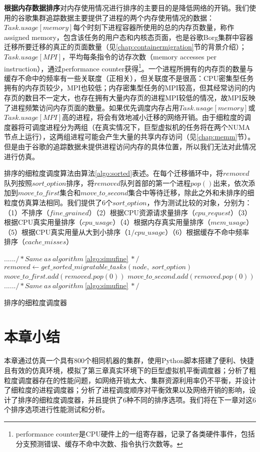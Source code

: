 \noindent\textbf{根据内存数据排序}\quad 对内存使用情况进行排序的主要目的是降低网络的开销。我们使用的谷歌集群追踪数据主要提供了进程的两个内存使用情况的数据：$Task.usage[memory]$每个时刻下进程容器所使用的总的内存页数量，称作assigned memory，包含该任务的用户态和内核态页面，也是谷歌Borg集群中容器迁移所要迁移的真正的页面数量（见\ref{chap:containermigration}节的背景介绍）；$Task.usage[MPI]$，平均每条指令的访存次数（memory accesses per instruction），通过performance counter获得\footnote{performance counter\cite{perf}是CPU硬件上的一组寄存器，记录了各类硬件事件，包括分支预测错误、缓存不命中次数、指令执行次数等。}。一个进程所拥有的内存页的数量与缓存不命中的频率有一些关联度（正相关），但关联度不是很高：CPU密集型任务拥有的内存页较少，MPI也较低；内存密集型任务的MPI较高，但其经常访问的内存页的数目不一定大，也存在拥有大量内存页的进程MPI较低的情况，故MPI反映了进程频繁访问内存页面的数量。如果优先调度内存占用$Task.usage[memory]$或$Task.usage[MPI]$高的进程，将会有效地减小迁移的网络开销。由于细粒度的调度器将可调度进程分为两组（在真实情况下，巨型虚拟机的任务将在两个NUMA节点上运行），这两组进程可能会产生大量的共享内存访问（见\ref{chap:memm}节）。但是由于谷歌的追踪数据未提供进程访问内存的具体位置，所以我们无法对此情况进行仿真。

排序的细粒度调度算法由算法\ref{algo:sorted}表述。在每个迁移循环中，将$removed$队列按照$sort\_option$排序，将$removed$队列首部的第一个进程$pop()$出来，依次添加到$move\_to\_first$集合和$move\_to\_second$集合中等待迁移，除此之外和未排序的细粒度仿真算法相同。我们提供了6个$sort\_option$，作为测试比较的对象，分别为：（1）不排序（$fine\_grained$）（2）根据CPU资源请求量排序（$cpu\_request$）（3）根据CPU真实用量排序（$cpu\_usage$）（4）根据内存真实用量排序（$mem\_usage$）（5）根据CPU真实用量从大到小排序（$1/cpu\_usage$）（6）根据缓存不命中频率排序（$cache\_misses$）

\begin{algorithm}[h]
\begin{algorithmic}[1]
\State $...... /* Same \ as\  algorithm\ $\ref{algo:simufine}$\ */$
\State $removed \gets get\_sorted\_migratable\_tasks(node,\ sort\_option)$
\State $move\_to\_first.add(removed.pop(0))$
\EndWhile
{}
\State $move\_to\_second.add(removed.pop(0))$
\EndWhile
\State $...... /* Same \ as\  algorithm\ $\ref{algo:simufine}$\ */$
\end{algorithmic}
\caption{排序的细粒度调度器}
\label{algo:sorted}
\end{algorithm}

\section{本章小结}
本章通过仿真一个具有800个相同机器的集群，使用Python脚本搭建了便利、快捷且有效的仿真环境，模拟了第三章真实环境下的巨型虚拟机平衡调度器；分析了粗粒度调度器存在的性能问题，如网络开销太大、集群资源利用率仍不平衡，并设计了细粒度的进程调度器；分析了进程调度顺序对平衡效果以及网络开销的影响，设计了排序的细粒度调度器，并且提供了6种不同的排序选项。我们将在下一章对这6个排序选项进行性能测试和分析。